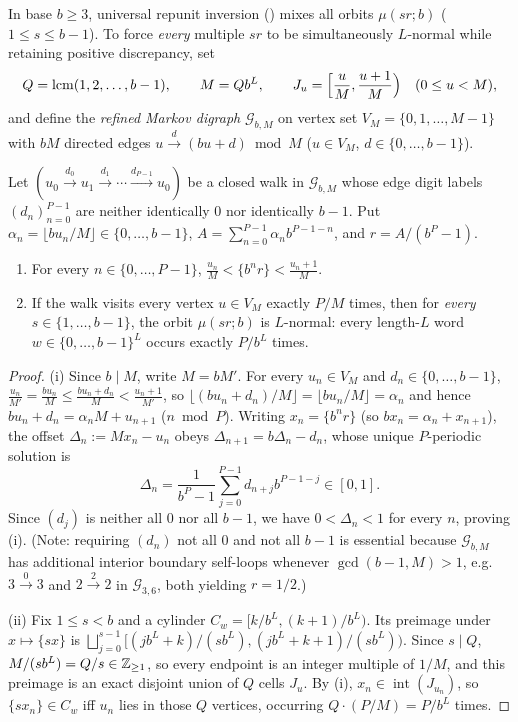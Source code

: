 \documentclass[11pt]{article}
\newcommand{\fr}[1]{\{#1\}}
\DeclareMathOperator{\lcm}{lcm}
\begin{document}
In base $b\ge3$, universal repunit inversion () mixes all orbits $\mu(sr;b)$ ($1\le s\le b-1$). To force \emph{every} multiple $sr$ to be simultaneously $L$-normal while retaining positive discrepancy, set
\[
Q=\lcm(1,2,\dots,b-1),\qquad M=Qb^L,\qquad J_u=\Bigl[\frac{u}{M},\frac{u+1}{M}\Bigr)\quad(0\le u<M),
\]
and define the \emph{refined Markov digraph} $\mathcal G_{b,M}$ on vertex set $V_M=\{0,1,\dots,M-1\}$ with $bM$ directed edges $u\xrightarrow{\;d\;}(bu+d)\bmod M$ ($u\in V_M$, $d\in\{0,\dots,b-1\}$).

\begin{lemma}\label{lem:refined-markov}
Let $(u_0\xrightarrow{d_0}u_1\xrightarrow{d_1}\cdots\xrightarrow{d_{P-1}}u_0)$ be a closed walk in $\mathcal G_{b,M}$ whose edge digit labels $(d_n)_{n=0}^{P-1}$ are neither identically $0$ nor identically $b-1$. Put $\alpha_n=\lfloor bu_n/M\rfloor\in\{0,\dots,b-1\}$, $A=\sum_{n=0}^{P-1}\alpha_n b^{P-1-n}$, and $r=A/(b^P-1)$.
\begin{enumerate}[label=\textup{(\roman*)},nosep]
\item For every $n\in\{0,\dots,P-1\}$, $\frac{u_n}{M}<\fr{b^nr}<\frac{u_n+1}{M}$.
\item If the walk visits every vertex $u\in V_M$ exactly $P/M$ times, then for \emph{every} $s\in\{1,\dots,b-1\}$, the orbit $\mu(sr;b)$ is $L$-normal: every length-$L$ word $w\in\{0,\dots,b-1\}^L$ occurs exactly $P/b^L$ times.
\end{enumerate}
\end{lemma}

\begin{proof}
(i) Since $b\mid M$, write $M=bM'$. For every $u_n\in V_M$ and $d_n\in\{0,\dots,b-1\}$, $\frac{u_n}{M'}=\frac{bu_n}{M}\le\frac{bu_n+d_n}{M}<\frac{u_n+1}{M'}$, so $\lfloor(bu_n+d_n)/M\rfloor=\lfloor bu_n/M\rfloor=\alpha_n$ and hence $bu_n+d_n=\alpha_n M+u_{n+1}$ ($n\bmod P$). Writing $x_n=\fr{b^nr}$ (so $bx_n=\alpha_n+x_{n+1}$), the offset $\Delta_n:=Mx_n-u_n$ obeys $\Delta_{n+1}=b\Delta_n-d_n$, whose unique $P$-periodic solution is
\[
\Delta_n=\frac1{b^P-1}\sum_{j=0}^{P-1}d_{n+j}b^{P-1-j}\in[0,1].
\]
Since $(d_j)$ is neither all $0$ nor all $b-1$, we have $0<\Delta_n<1$ for every $n$, proving (i). (Note: requiring $(d_n)$ not all $0$ and not all $b-1$ is essential because $\mathcal G_{b,M}$ has additional interior boundary self-loops whenever $\gcd(b-1,M)>1$, e.g.\ $3\xrightarrow{0}3$ and $2\xrightarrow{2}2$ in $\mathcal G_{3,6}$, both yielding $r=1/2$.)

(ii) Fix $1\le s<b$ and a cylinder $C_w=[k/b^L,(k+1)/b^L)$. Its preimage under $x\mapsto\fr{sx}$ is $\bigsqcup_{j=0}^{s-1}[(jb^L+k)/(sb^L),(jb^L+k+1)/(sb^L))$. Since $s\mid Q$, $M/(sb^L)=Q/s\in\mathbb Z_{\ge1}$, so every endpoint is an integer multiple of $1/M$, and this preimage is an exact disjoint union of $Q$ cells $J_u$. By (i), $x_n\in\operatorname{int}(J_{u_n})$, so $\fr{sx_n}\in C_w$ iff $u_n$ lies in those $Q$ vertices, occurring $Q\cdot(P/M)=P/b^L$ times.
\end{proof}
\end{document}
